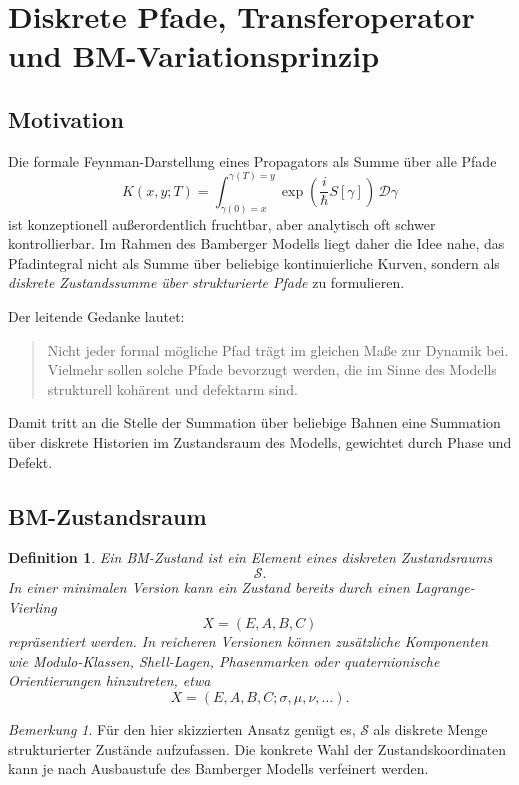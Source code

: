 \documentclass[11pt,a4paper]{article}
\newtheorem{definition}{Definition}
\theoremstyle{remark}
\newtheorem{bemerkung}{Bemerkung}
\begin{document}
	\section{Diskrete Pfade, Transferoperator und BM-Variationsprinzip}
	
	\subsection{Motivation}
	
	Die formale Feynman-Darstellung eines Propagators als Summe über alle Pfade
	\[
	K(x,y;T)=\int_{\gamma(0)=x}^{\gamma(T)=y}
	\exp\!\left(\frac{i}{\hbar}S[\gamma]\right)\,\mathcal D\gamma
	\]
	ist konzeptionell außerordentlich fruchtbar, aber analytisch oft schwer kontrollierbar. 
	Im Rahmen des Bamberger Modells liegt daher die Idee nahe, das Pfadintegral nicht als Summe über beliebige kontinuierliche Kurven, sondern als \emph{diskrete Zustandssumme über strukturierte Pfade} zu formulieren.
	
	Der leitende Gedanke lautet:
	\begin{quote}
		Nicht jeder formal mögliche Pfad trägt im gleichen Maße zur Dynamik bei. 
		Vielmehr sollen solche Pfade bevorzugt werden, die im Sinne des Modells strukturell kohärent und defektarm sind.
	\end{quote}
	
	Damit tritt an die Stelle der Summation über beliebige Bahnen eine Summation über diskrete Historien im Zustandsraum des Modells, gewichtet durch Phase und Defekt.
	
	\subsection{BM-Zustandsraum}
	
	\begin{definition}
		Ein \emph{BM-Zustand} ist ein Element eines diskreten Zustandsraums
		\[
		\mathcal S.
		\]
		In einer minimalen Version kann ein Zustand bereits durch einen Lagrange-Vierling
		\[
		X=(E,A,B,C)
		\]
		repräsentiert werden. 
		In reicheren Versionen können zusätzliche Komponenten wie Modulo-Klassen, Shell-Lagen, Phasenmarken oder quaternionische Orientierungen hinzutreten, etwa
		\[
		X=(E,A,B,C;\sigma,\mu,\nu,\dots).
		\]
	\end{definition}
	
	\begin{bemerkung}
		Für den hier skizzierten Ansatz genügt es, \(\mathcal S\) als diskrete Menge strukturierter Zustände aufzufassen. 
		Die konkrete Wahl der Zustandskoordinaten kann je nach Ausbaustufe des Bamberger Modells verfeinert werden.
	\end{bemerkung}
	
\end{document}
